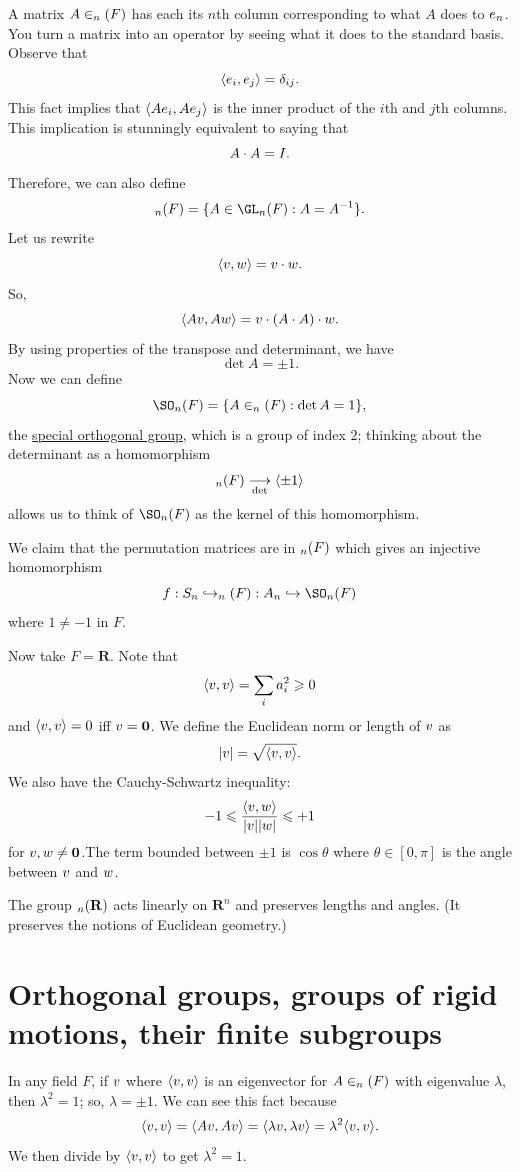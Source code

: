 \documentclass[11pt, oneside]{amsart}
\numberwithin{equation}{section}
\numberwithin{theorem}{section}
\theoremstyle{definition}
\let\O\relax
\let\bf\relax
\let\t\relax
\def\R{\mathbf{R}}
\def\0{\mathbf{0}}
\begin{document}
A matrix $A\in \O_n(F)$ has each its $n$th column corresponding to what $A$ does to $\bf e_n$. You turn a matrix into an operator by seeing what it does to the standard basis. Observe that
$$
\langle \bf e_i, \bf e_j \rangle = \delta_{ij}.
$$
This fact implies that $\langle A\bf e_i, A\bf e_j \rangle $ is the inner product of the $i$th and $j$th columns. This implication is stunningly equivalent to saying that
$$
\t{A} \cdot A = I.
$$
Therefore, we can also define
$$
\O_n(F) = \{A\in \GL_n(F) : \t{A}=A^{-1}\}.
$$
Let us rewrite
$$
\langle\bf v,\bf w\rangle = \t{\bf v}\cdot \bf w.
$$
So, 
$$
\langle A\bf v,A\bf w\rangle = \t{\bf v}\cdot(\t{A}\cdot A)\cdot\bf w.
$$
By using properties of the transpose and determinant, we have
$$
\det A = \pm 1.
$$
Now we can define
$$
\SO_n(F) = \{A\in \O_n(F) : \det A = 1\},
$$
the \underline{special orthogonal group}, which is a group of index $2$; thinking about the determinant as a homomorphism
$$
\O_n(F) \underset{\det}{\longrightarrow}\langle\pm 1\rangle
$$
allows us to think of $\SO_n(F)$ as the kernel of this homomorphism.

We claim that the permutation matrices are in $\O_n(F)$ which gives an injective homomorphism
$$
f : S_n\hookrightarrow \O_n(F) : A_n \hookrightarrow \SO_n(F)
$$
where $1\neq -1$ in $F$.

Now take $F=\R$. Note that 
$$
\langle\bf v, \bf v\rangle = \sum_i a_i^2 \geqslant 0
$$
and $\langle\bf v, \bf v\rangle = 0$ iff $\bf v=\0$. We define the Euclidean norm or length of $\bf v$ as
$$
|\bf v| = \sqrt{\langle\bf v, \bf v\rangle}. 
$$
We also have the Cauchy-Schwartz inequality:
$$
-1 \leqslant \frac{\langle\bf v, \bf w\rangle}{|\bf v||\bf w|}\leqslant +1 
$$
for $\bf v, \bf w \neq \0$.The term bounded between $\pm 1$ is $\cos \theta$ where $\theta \in [0, \pi]$ is the angle between $\bf v$ and $\bf w$.

The group $\O_n(\R)$ acts linearly on $\R^n$ and preserves lengths and angles. (It preserves the notions of Euclidean geometry.)

\section{Orthogonal groups, groups of rigid motions, their finite subgroups}
In any field $F$, if $\bf v$ where $\langle\bf v,\bf v\rangle$ is an eigenvector for $A\in\O_n(F)$ with eigenvalue $\lambda$, then $\lambda^2 = 1$; so, $\lambda = \pm 1$. We can see this fact because
$$
\langle \bf v,\bf v\rangle = \langle A\bf v,A\bf v\rangle = \langle \lambda\bf v,\lambda\bf v\rangle = \lambda^2\langle \bf v,\bf v\rangle.
$$
We then divide by $\langle\bf v,\bf v\rangle$ to get $\lambda^2 = 1$.
\end{document}
